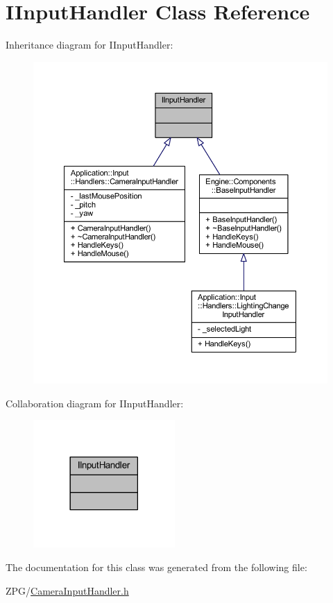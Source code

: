 \hypertarget{classEngine_1_1Components_1_1IInputHandler}{}\section{I\+Input\+Handler Class Reference}
\label{classEngine_1_1Components_1_1IInputHandler}


Inheritance diagram for I\+Input\+Handler\+:
\nopagebreak
\begin{figure}[H]
\begin{center}
\leavevmode
\includegraphics[width=350pt]{classEngine_1_1Components_1_1IInputHandler__inherit__graph}
\end{center}
\end{figure}


Collaboration diagram for I\+Input\+Handler\+:
\nopagebreak
\begin{figure}[H]
\begin{center}
\leavevmode
\includegraphics[width=153pt]{classEngine_1_1Components_1_1IInputHandler__coll__graph}
\end{center}
\end{figure}


The documentation for this class was generated from the following file\+:\begin{DoxyCompactItemize}
\item 
Z\+P\+G/\mbox{\hyperlink{CameraInputHandler_8h}{Camera\+Input\+Handler.\+h}}\end{DoxyCompactItemize}
